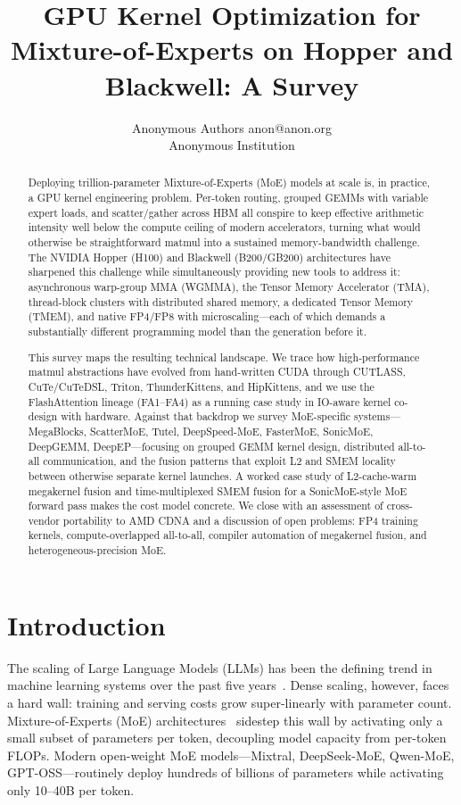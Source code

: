 \documentclass[10pt]{article}
\title{GPU Kernel Optimization for Mixture-of-Experts on Hopper and Blackwell: A Survey}
\author{\name Anonymous Authors \email anon@anon.org \\ \addr Anonymous Institution}
\begin{document}
\maketitle

\begin{abstract}
Deploying trillion-parameter Mixture-of-Experts (MoE) models at scale is, in practice, a GPU kernel engineering problem. Per-token routing, grouped GEMMs with variable expert loads, and scatter/gather across HBM all conspire to keep effective arithmetic intensity well below the compute ceiling of modern accelerators, turning what would otherwise be straightforward matmul into a sustained memory-bandwidth challenge. The NVIDIA Hopper (H100) and Blackwell (B200/GB200) architectures have sharpened this challenge while simultaneously providing new tools to address it: asynchronous warp-group MMA (WGMMA), the Tensor Memory Accelerator (TMA), thread-block clusters with distributed shared memory, a dedicated Tensor Memory (TMEM), and native FP4/FP8 with microscaling---each of which demands a substantially different programming model than the generation before it.

This survey maps the resulting technical landscape. We trace how high-performance matmul abstractions have evolved from hand-written CUDA through CUTLASS, CuTe/CuTeDSL, Triton, ThunderKittens, and HipKittens, and we use the FlashAttention lineage (FA1--FA4) as a running case study in IO-aware kernel co-design with hardware. Against that backdrop we survey MoE-specific systems---MegaBlocks, ScatterMoE, Tutel, DeepSpeed-MoE, FasterMoE, SonicMoE, DeepGEMM, DeepEP---focusing on grouped GEMM kernel design, distributed all-to-all communication, and the fusion patterns that exploit L2 and SMEM locality between otherwise separate kernel launches. A worked case study of L2-cache-warm megakernel fusion and time-multiplexed SMEM fusion for a SonicMoE-style MoE forward pass makes the cost model concrete. We close with an assessment of cross-vendor portability to AMD CDNA and a discussion of open problems: FP4 training kernels, compute-overlapped all-to-all, compiler automation of megakernel fusion, and heterogeneous-precision MoE.
\end{abstract}

\section{Introduction}
\label{sec:intro}

The scaling of Large Language Models (LLMs) has been the defining trend in machine learning systems over the past five years~\citep{brown2020gpt3,touvron2023llama,achiam2023gpt4}. Dense scaling, however, faces a hard wall: training and serving costs grow super-linearly with parameter count. Mixture-of-Experts (MoE) architectures~\citep{shazeer2017outrageously,fedus2022switch,lepikhin2021gshard,jiang2024mixtral} sidestep this wall by activating only a small subset of parameters per token, decoupling model capacity from per-token FLOPs. Modern open-weight MoE models---Mixtral, DeepSeek-MoE, Qwen-MoE, GPT-OSS---routinely deploy hundreds of billions of parameters while activating only 10--40B per token.
\end{document}
